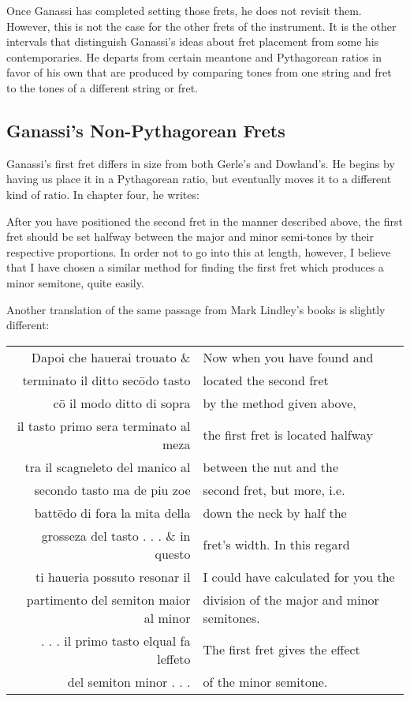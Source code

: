 Once Ganassi has completed setting those frets, he does not revisit them. However, this is not the case for the other
frets of the instrument. It is the other intervals that distinguish Ganassi's ideas about fret placement from some his
contemporaries. He departs from certain meantone and Pythagorean ratios in favor of his own that are produced by
comparing tones from one string and fret to the tones of a different string or fret.

\subsection{Ganassi's Non-Pythagorean Frets}

Ganassi's first fret differs in size from both Gerle's and Dowland's. He begins by having
us place it in a Pythagorean ratio, but eventually moves it to a different
kind of ratio. In chapter four, he writes:
\begin{blocks}
After you have positioned the second fret in the manner described above, the
first fret should be set halfway between the major and minor semi-tones by
their respective proportions. In order not to go into this at length, however,
I believe that I have chosen a similar method for finding the first fret which
produces a minor semitone, quite easily.\autocite[106]{RB:2}
\end{blocks}
Another translation of the same passage from Mark Lindley's books is slightly different:
\begin{blocks}
\begin{center}
\begin{tabular}{r l}
Dapoi che hauerai trouato \&      & Now when you have found and \\
terminato il ditto sec\={o}do tasto  & located the second fret \\
c\={o} il modo ditto di sopra     & by the method given above, \\
il tasto primo sera terminato al meza & the first fret is located halfway \\
tra il scagneleto del manico al    & between the nut and the \\
secondo tasto ma de piu zoe      & second fret, but more, i.e. \\
batt\={e}do di fora la mita della   & down the neck by half the \\
grosseza del tasto . . . \& in questo & fret's width. In this regard \\
ti haueria possuto resonar il     & I could have calculated for you the \\
partimento del semiton maior al minor & division of the major and minor semitones. \\
. . . il primo tasto elqual fa leffeto & The first fret gives the effect \\
del semiton minor . . .        & of the minor semitone. \\
\end{tabular}
\end{center}
\end{blocks}

